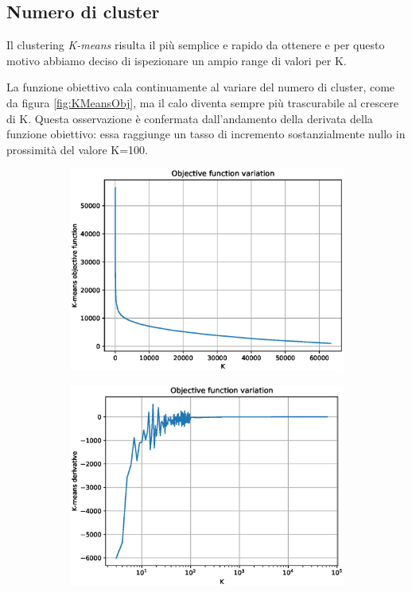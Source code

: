 \documentclass[
	11pt, %
	a4paper, %
	oneside, %
	headinclude,footinclude, %
	BCOR5mm, %
]{scrartcl}
\begin{document}
	\subsection{Numero di cluster}
		Il clustering \emph{K-means} risulta il più semplice e rapido da ottenere e per questo motivo abbiamo deciso di ispezionare un ampio range di valori per K.

		La funzione obiettivo cala continuamente al variare del numero di cluster, come da figura \ref{fig:KMeansObj}, ma il calo diventa sempre più trascurabile al crescere di K.
		Questa osservazione è confermata dall'andamento della derivata della funzione obiettivo: essa raggiunge un tasso di incremento sostanzialmente nullo in prossimità del valore K=100.

		\begin{figure}[!htb]
			\hspace{-1cm}
			\begin{subfigure}{.5\textwidth}
				\centering
				\includegraphics[scale=.5]{Figures/KMeans.eps}
			\end{subfigure}
			\hspace{0.5cm}
			\begin{subfigure}{.5\textwidth}
				\centering
				\includegraphics[scale=.5]{Figures/KMeansDerivative.eps}

\end{subfigure}
\end{figure}
\end{document}
